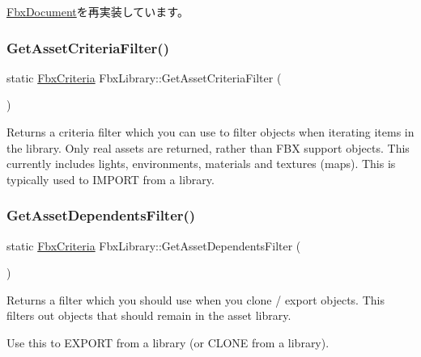 \hyperlink{class_fbx_document_a172d19ae540cbd086ade62adaf1a54b8}{Fbx\+Document}を再実装しています。

\mbox{\label{class_fbx_library_a562702d3ba172e178bf0d63ba5b9974b}} 
\subsubsection{\texorpdfstring{Get\+Asset\+Criteria\+Filter()}{GetAssetCriteriaFilter()}}
{\footnotesize\ttfamily static \hyperlink{class_fbx_criteria}{Fbx\+Criteria} Fbx\+Library\+::\+Get\+Asset\+Criteria\+Filter (\begin{DoxyParamCaption}{ }\end{DoxyParamCaption})\hspace{0.3cm}{\ttfamily [static]}}

Returns a criteria filter which you can use to filter objects when iterating items in the library. Only real \textquotesingle{}assets\textquotesingle{} are returned, rather than F\+BX support objects. This currently includes lights, environments, materials and textures (maps). This is typically used to I\+M\+P\+O\+RT from a library. \mbox{\label{class_fbx_library_a88507d4654d1a906ea7999165af7d92b}} 
\subsubsection{\texorpdfstring{Get\+Asset\+Dependents\+Filter()}{GetAssetDependentsFilter()}}
{\footnotesize\ttfamily static \hyperlink{class_fbx_criteria}{Fbx\+Criteria} Fbx\+Library\+::\+Get\+Asset\+Dependents\+Filter (\begin{DoxyParamCaption}{ }\end{DoxyParamCaption})\hspace{0.3cm}{\ttfamily [static]}}

Returns a filter which you should use when you clone / export objects. This filters out objects that should remain in the asset library.

Use this to E\+X\+P\+O\+RT from a library (or C\+L\+O\+NE from a library). \mbox{\label{class_fbx_library_a4fefd2b63aa4db5519af446945c0adef}} 
